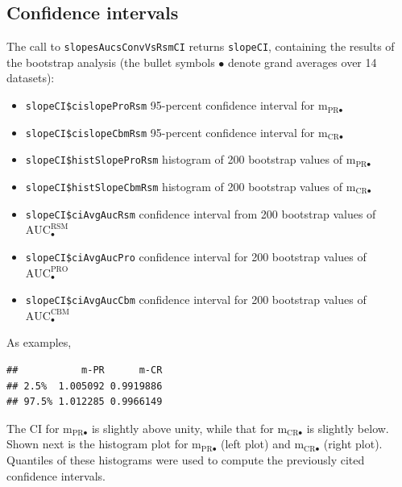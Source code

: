 \documentclass[
]{book}
\providecommand{\tightlist}{%
  \setlength{\itemsep}{0pt}\setlength{\parskip}{0pt}}
\begin{document}
\hypertarget{rsm-3-fits-confidence-intervals}{%
\subsection{Confidence intervals}\label{rsm-3-fits-confidence-intervals}}

The call to \texttt{slopesAucsConvVsRsmCI} returns \texttt{slopeCI}, containing the results of the bootstrap analysis (the bullet symbols \(\bullet\) denote grand averages over 14 datasets):

\begin{itemize}
\tightlist
\item
  \texttt{slopeCI\$cislopeProRsm} 95-percent confidence interval for \(\text{m}_{\text{PR} \bullet}\)
\item
  \texttt{slopeCI\$cislopeCbmRsm} 95-percent confidence interval for \(\text{m}_{\text{CR} \bullet}\)
\item
  \texttt{slopeCI\$histSlopeProRsm} histogram of 200 bootstrap values of \(\text{m}_{\text{PR} \bullet}\)
\item
  \texttt{slopeCI\$histSlopeCbmRsm} histogram of 200 bootstrap values of \(\text{m}_{\text{CR} \bullet}\)
\item
  \texttt{slopeCI\$ciAvgAucRsm} confidence interval from 200 bootstrap values of \(\text{AUC}^{\text{RSM}}_\bullet\)
\item
  \texttt{slopeCI\$ciAvgAucPro} confidence interval for 200 bootstrap values of \(\text{AUC}^{\text{PRO}}_\bullet\)
\item
  \texttt{slopeCI\$ciAvgAucCbm} confidence interval for 200 bootstrap values of \(\text{AUC}^{\text{CBM}}_\bullet\)
\end{itemize}

As examples,

\begin{verbatim}
##           m-PR      m-CR
## 2.5%  1.005092 0.9919886
## 97.5% 1.012285 0.9966149
\end{verbatim}

The CI for \(\text{m}_{\text{PR} \bullet}\) is slightly above unity, while that for \(\text{m}_{\text{CR} \bullet}\) is slightly below. Shown next is the histogram plot for \(\text{m}_{\text{PR} \bullet}\) (left plot) and \(\text{m}_{\text{CR} \bullet}\) (right plot). Quantiles of these histograms were used to compute the previously cited confidence intervals.
\end{document}
